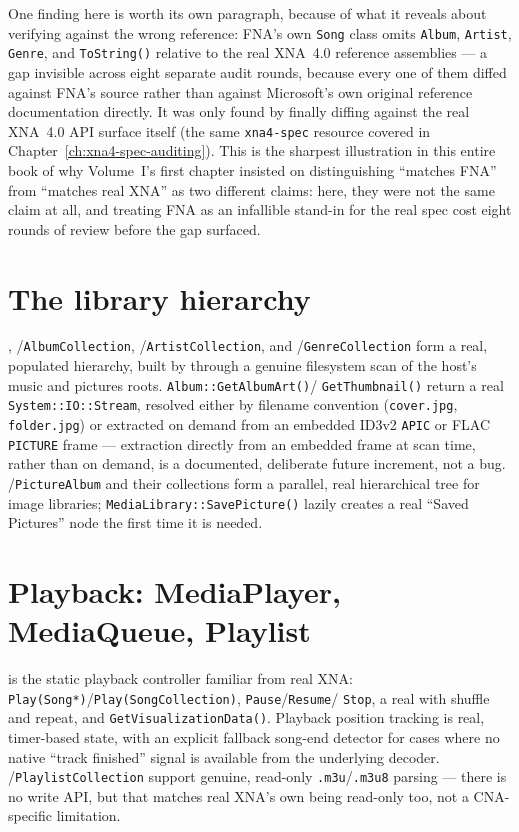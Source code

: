 One finding here is worth its own paragraph, because of what it reveals about verifying
against the wrong reference: FNA's own \texttt{Song} class omits \texttt{Album},
\texttt{Artist}, \texttt{Genre}, and \texttt{ToString()} relative to the real XNA~4.0
reference assemblies --- a gap invisible across eight separate audit rounds, because every
one of them diffed against FNA's source rather than against Microsoft's own original
reference documentation directly. It was only found by finally diffing against the real
XNA~4.0 API surface itself (the same \texttt{xna4-spec} resource covered in
Chapter~\ref{ch:xna4-spec-auditing}). This is the sharpest illustration in this entire book of
why Volume~I's first chapter insisted on distinguishing ``matches FNA'' from ``matches real
XNA'' as two different claims: here, they were not the same claim at all, and treating FNA as
an infallible stand-in for the real spec cost eight rounds of review before the gap surfaced.

\section{The library hierarchy}
\label{sec:medialibrary}

, /\texttt{AlbumCollection},
/\texttt{ArtistCollection}, and /\texttt{GenreCollection}
form a real, populated hierarchy, built by  through a genuine
filesystem scan of the host's music and pictures roots. \texttt{Album::GetAlbumArt()}/%
\texttt{GetThumbnail()} return a real \texttt{System::IO::Stream}, resolved either by
filename convention (\texttt{cover.jpg}, \texttt{folder.jpg}) or extracted on demand from an
embedded ID3v2 \texttt{APIC} or FLAC \texttt{PICTURE} frame --- extraction directly from an
embedded frame at scan time, rather than on demand, is a documented, deliberate future
increment, not a bug. /\texttt{PictureAlbum} and their collections form a
parallel, real hierarchical tree for image libraries; \texttt{MediaLibrary::SavePicture()}
lazily creates a real ``Saved Pictures'' node the first time it is needed.

\section{Playback: MediaPlayer, MediaQueue, Playlist}

 is the static playback controller familiar from real XNA:
\texttt{Play(Song*)}/\texttt{Play(SongCollection)}, \texttt{Pause}/\texttt{Resume}/%
\texttt{Stop}, a real  with shuffle and repeat, and
\texttt{GetVisualizationData()}. Playback position tracking is real, timer-based state, with
an explicit fallback song-end detector for cases where no native ``track finished'' signal is
available from the underlying decoder. /\texttt{PlaylistCollection}
support genuine, read-only \texttt{.m3u}/\texttt{.m3u8} parsing --- there is no write API, but
that matches real XNA's own  being read-only too, not a CNA-specific
limitation.


